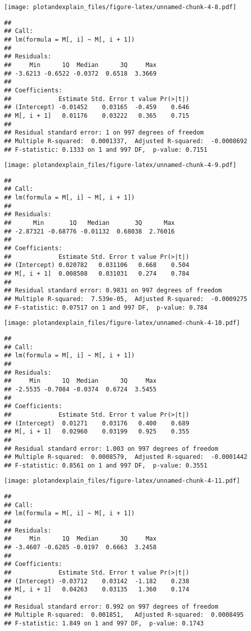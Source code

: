 \documentclass[]{article}
\begin{document}
\texttt{[image: plotandexplain\_files/figure-latex/unnamed-chunk-4-8.pdf]}

\begin{verbatim}
## 
## Call:
## lm(formula = M[, i] ~ M[, i + 1])
## 
## Residuals:
##     Min      1Q  Median      3Q     Max 
## -3.6213 -0.6522 -0.0372  0.6518  3.3669 
## 
## Coefficients:
##             Estimate Std. Error t value Pr(>|t|)
## (Intercept) -0.01452    0.03165  -0.459    0.646
## M[, i + 1]   0.01176    0.03222   0.365    0.715
## 
## Residual standard error: 1 on 997 degrees of freedom
## Multiple R-squared:  0.0001337,  Adjusted R-squared:  -0.0008692 
## F-statistic: 0.1333 on 1 and 997 DF,  p-value: 0.7151
\end{verbatim}

\texttt{[image: plotandexplain\_files/figure-latex/unnamed-chunk-4-9.pdf]}

\begin{verbatim}
## 
## Call:
## lm(formula = M[, i] ~ M[, i + 1])
## 
## Residuals:
##      Min       1Q   Median       3Q      Max 
## -2.87321 -0.68776 -0.01132  0.68038  2.76016 
## 
## Coefficients:
##             Estimate Std. Error t value Pr(>|t|)
## (Intercept) 0.020782   0.031106   0.668    0.504
## M[, i + 1]  0.008508   0.031031   0.274    0.784
## 
## Residual standard error: 0.9831 on 997 degrees of freedom
## Multiple R-squared:  7.539e-05,  Adjusted R-squared:  -0.0009275 
## F-statistic: 0.07517 on 1 and 997 DF,  p-value: 0.784
\end{verbatim}

\texttt{[image: plotandexplain\_files/figure-latex/unnamed-chunk-4-10.pdf]}

\begin{verbatim}
## 
## Call:
## lm(formula = M[, i] ~ M[, i + 1])
## 
## Residuals:
##     Min      1Q  Median      3Q     Max 
## -2.5535 -0.7084 -0.0374  0.6724  3.5455 
## 
## Coefficients:
##             Estimate Std. Error t value Pr(>|t|)
## (Intercept)  0.01271    0.03176   0.400    0.689
## M[, i + 1]   0.02960    0.03199   0.925    0.355
## 
## Residual standard error: 1.003 on 997 degrees of freedom
## Multiple R-squared:  0.0008579,  Adjusted R-squared:  -0.0001442 
## F-statistic: 0.8561 on 1 and 997 DF,  p-value: 0.3551
\end{verbatim}

\texttt{[image: plotandexplain\_files/figure-latex/unnamed-chunk-4-11.pdf]}

\begin{verbatim}
## 
## Call:
## lm(formula = M[, i] ~ M[, i + 1])
## 
## Residuals:
##     Min      1Q  Median      3Q     Max 
## -3.4607 -0.6285 -0.0197  0.6663  3.2458 
## 
## Coefficients:
##             Estimate Std. Error t value Pr(>|t|)
## (Intercept) -0.03712    0.03142  -1.182    0.238
## M[, i + 1]   0.04263    0.03135   1.360    0.174
## 
## Residual standard error: 0.992 on 997 degrees of freedom
## Multiple R-squared:  0.001851,   Adjusted R-squared:  0.0008495 
## F-statistic: 1.849 on 1 and 997 DF,  p-value: 0.1743
\end{verbatim}
\end{document}
